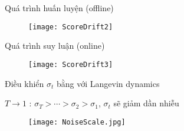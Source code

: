 

\begin{frame}{Quá trình huấn luyện (offline)}
	\begin{figure}
		\texttt{[image: ScoreDrift2]}
	\end{figure}
\end{frame}
\begin{frame}{Quá trình suy luận (online)}
	\begin{figure}
		\texttt{[image: ScoreDrift3]}
	\end{figure}
\end{frame}


\begin{frame}{Điều khiển $\sigma_t$ bằng với Langevin dynamics}
	

	
	$T \rightarrow 1$ :  $\sigma_T > \cdots  >  \sigma_2 > \sigma_1$, $\sigma_t$ sẽ giảm dần nhiễu
		
	\begin{figure}
		\centering
		\texttt{[image: NoiseScale.jpg]}
	\end{figure}
\end{frame}



